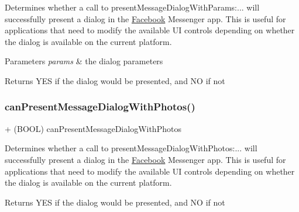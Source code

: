 Determines whether a call to {\ttfamily present\+Message\+Dialog\+With\+Params\+:...} will successfully present a dialog in the \hyperlink{interfaceFacebook}{Facebook} Messenger app. This is useful for applications that need to modify the available UI controls depending on whether the dialog is available on the current platform.


\begin{DoxyParams}{Parameters}
{\em params} & the dialog parameters\\
\hline
\end{DoxyParams}
\begin{DoxyReturn}{Returns}
Y\+ES if the dialog would be presented, and NO if not 
\end{DoxyReturn}
\mbox{\label{interfaceFBDialogs_ac10e310c30d763c7885c11fb44ac4924}} 
\subsubsection{\texorpdfstring{can\+Present\+Message\+Dialog\+With\+Photos()}{canPresentMessageDialogWithPhotos()}\hspace{0.1cm}{\footnotesize\ttfamily [1/5]}}
{\footnotesize\ttfamily + (B\+O\+OL) can\+Present\+Message\+Dialog\+With\+Photos \begin{DoxyParamCaption}{ }\end{DoxyParamCaption}}

Determines whether a call to {\ttfamily present\+Message\+Dialog\+With\+Photos\+:...} will successfully present a dialog in the \hyperlink{interfaceFacebook}{Facebook} Messenger app. This is useful for applications that need to modify the available UI controls depending on whether the dialog is available on the current platform.

\begin{DoxyReturn}{Returns}
Y\+ES if the dialog would be presented, and NO if not 
\end{DoxyReturn}
\mbox{\label{interfaceFBDialogs_ac10e310c30d763c7885c11fb44ac4924}} 
